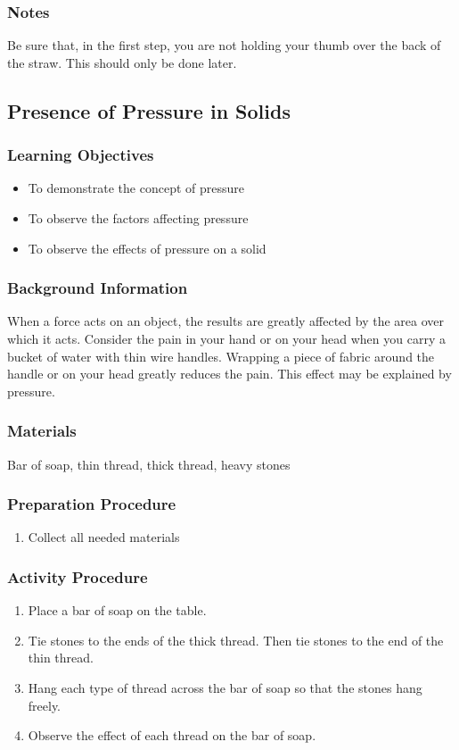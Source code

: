 \subsubsection*{Notes}
Be sure that, in the first step, you are not holding your thumb over the back of the straw.  This should only be done later.

\subsection{Presence of Pressure in Solids}

\subsubsection*{Learning Objectives}
\begin{itemize}
\item{To demonstrate the concept of pressure}
\item{To observe the factors affecting pressure} 
\item{To observe the effects of pressure on a solid} 
\end{itemize}

\subsubsection*{Background Information}
When a force acts on an object, the results are greatly affected by the area over which it acts.  Consider the pain in your hand or on your head when you carry a bucket of water with thin wire handles.  Wrapping a piece of fabric around the handle or on your head greatly reduces the pain.  This effect may be explained by pressure.

\subsubsection*{Materials}
Bar of soap, thin thread, thick thread, heavy stones

\subsubsection*{Preparation Procedure}
\begin{enumerate}
\item{Collect all needed materials}
\end{enumerate}

\subsubsection*{Activity Procedure}
\begin{enumerate}
\item{Place a bar of soap on the table.} 
\item{Tie stones to the ends of the thick thread. Then tie stones to the end of the thin thread.} 
\item{Hang each type of thread across the bar of soap so that the stones hang freely.} 
\item{Observe the effect of each thread on the bar of soap.} 
\end{enumerate}

